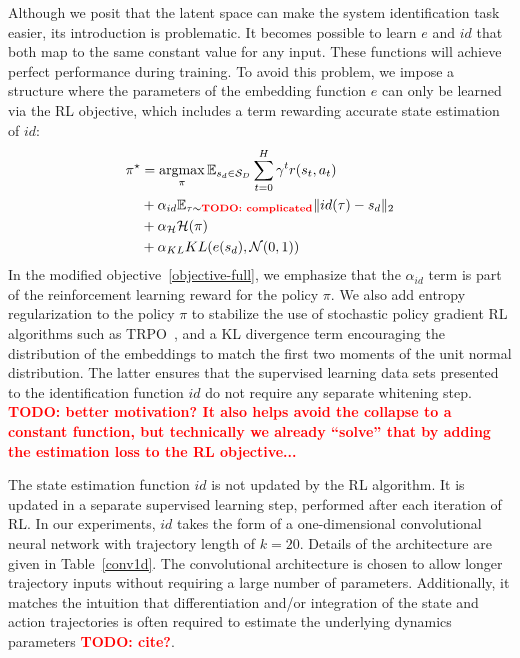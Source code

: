 \documentclass{article}
\newcommand{\E}{\mathbb{E}}
\newcommand{\TODO}[1]{\textcolor{red}{\textbf{TODO: #1}}}
\newcommand{\cH}{\mathcal{H}}
\newcommand{\cN}{\mathcal{N}}
\newcommand{\cS}{\mathcal{S}}
\DeclareMathOperator*{\argmax}{argmax}
\begin{document}
Although we posit that the latent space can make the system identification task easier,
its introduction is problematic.
It becomes possible to learn $e$ and $id$ that both map to the same constant value for any input.
These functions will achieve perfect performance during training.
To avoid this problem, we impose a structure where the parameters of the embedding function $e$
can only be learned via the RL objective, which includes a term rewarding accurate state estimation of $id$:
\begin{equation}\begin{split}
\pi^\star &= \argmax_\pi \E_{s_d \in \cS_D} \sum_{t = 0}^H \gamma^t r(s_t, a_t) \\
&+ \alpha_{id} \E_{\tau \sim \text{\TODO{complicated}}} \| id(\tau) - s_d \|_2 \\
&+ \alpha_{\cH}\cH(\pi) \\
&+ \alpha_{KL} KL(e(s_d), \cN(0,1))
\label{objective-full}
\end{split}\end{equation}
In the modified objective~\eqref{objective-full},
we emphasize that the $\alpha_{id}$ term is part of the reinforcement learning reward
for the policy $\pi$.
We also add entropy regularization to the policy $\pi$ to stabilize the use of stochastic policy gradient RL algorithms such as TRPO~\citep{schulman-TRPO-icml15},
and a KL divergence term encouraging the distribution of the embeddings
to match the first two moments of the unit normal distribution.
The latter ensures that the supervised learning data sets presented to the identification function $id$ do not require any separate whitening step.
\TODO{better motivation? It also helps avoid the collapse to a constant function,
but technically we already ``solve'' that by adding the estimation loss to the RL objective...}

The state estimation function $id$ is not updated by the RL algorithm.
It is updated in a separate supervised learning step, performed after each iteration of RL.
In our experiments, $id$ takes the form of a one-dimensional convolutional neural network
with trajectory length of $k = 20$.
Details of the architecture are given in Table~\ref{conv1d}.
The convolutional architecture is chosen to allow longer trajectory inputs
without requiring a large number of parameters.
Additionally, it matches the intuition that differentiation and/or integration of the state and action trajectories
is often required to estimate the underlying dynamics parameters \TODO{cite?}.
\end{document}

